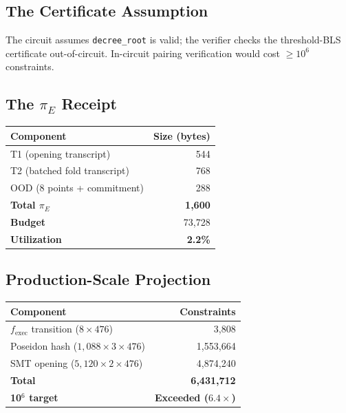 \documentclass[11pt, a4paper]{article}
\theoremstyle{plain}
\theoremstyle{definition}
\theoremstyle{remark}
\begin{document}
\subsection{The Certificate Assumption}

The circuit assumes \texttt{decree\_root} is valid; the verifier
checks the threshold-BLS certificate out-of-circuit. In-circuit
pairing verification would cost $\ge 10^6$ constraints.

\subsection{The $\pi_E$ Receipt}

\begin{table}[h]
\centering
{}
\begin{tabular}{lr}
\rowcolor{hsmaPurple!20} \textbf{Component} & \textbf{Size (bytes)} \\
\midrule
T1 (opening transcript) & 544 \\
T2 (batched fold transcript) & 768 \\
OOD (8 points + commitment) & 288 \\
\midrule
\rowcolor{hsmaGreen!15} \textbf{Total $\pi_E$} & \textcolor{hsmaGreen}{\textbf{1{,}600}} \\
\textbf{Budget} & 73{,}728 \\
\textcolor{hsmaGreen}{\textbf{Utilization}} & \textcolor{hsmaGreen}{\textbf{2.2\%}} \\
\bottomrule
\end{tabular}
\end{table}

\subsection{Production-Scale Projection}

\begin{table}[h]
\centering
{}
\begin{tabular}{lr}
\rowcolor{hsmaPurple!20} \textbf{Component} & \textbf{Constraints} \\
\midrule
 $f_{\text{exec}}$ transition ($8 \times 476$) & 3{,}808 \\
Poseidon hash ($1{,}088 \times 3 \times 476$) & 1{,}553{,}664 \\
SMT opening ($5{,}120 \times 2 \times 476$) & 4{,}874{,}240 \\
\midrule
\textbf{Total} & \textbf{6{,}431{,}712} \\
\textcolor{hsmaGreen}{\textbf{10$^6$ target}} & \textcolor{hsmaGreen}{\textbf{Exceeded ($6.4\times$)}} \\
\bottomrule
\end{tabular}
\end{table}
\end{document}
